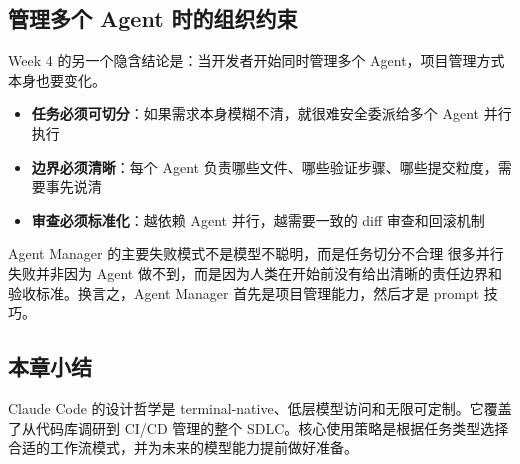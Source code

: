 \subsection{管理多个 Agent 时的组织约束}

Week 4 的另一个隐含结论是：当开发者开始同时管理多个 Agent，项目管理方式本身也要变化。

\begin{itemize}
    \item \textbf{任务必须可切分}：如果需求本身模糊不清，就很难安全委派给多个 Agent 并行执行
    \item \textbf{边界必须清晰}：每个 Agent 负责哪些文件、哪些验证步骤、哪些提交粒度，需要事先说清
    \item \textbf{审查必须标准化}：越依赖 Agent 并行，越需要一致的 diff 审查和回滚机制
\end{itemize}

\begin{warningbox}{Agent Manager 的主要失败模式不是模型不聪明，而是任务切分不合理}
很多并行失败并非因为 Agent 做不到，而是因为人类在开始前没有给出清晰的责任边界和验收标准。换言之，Agent Manager 首先是项目管理能力，然后才是 prompt 技巧。
\end{warningbox}

\subsection{本章小结}

Claude Code 的设计哲学是 terminal-native、低层模型访问和无限可定制。它覆盖了从代码库调研到 CI/CD 管理的整个 SDLC。核心使用策略是根据任务类型选择合适的工作流模式，并为未来的模型能力提前做好准备。

